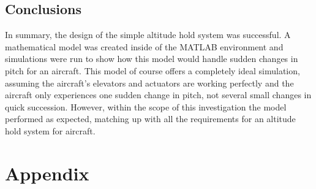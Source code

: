 \documentclass[stu, a4paper, 12pt, floatsintext]{apa7}
\numberwithin{figure}{section}
\numberwithin{table}{section}
\numberwithin{equation}{section}
\begin{document}
\subsection{Conclusions} 
In summary, the design of the simple altitude hold system was successful. A mathematical model was created inside of the MATLAB environment and simulations were run to show how this model would handle sudden changes in pitch for an aircraft. This model of course offers a completely ideal simulation, assuming the aircraft's elevators and actuators are working perfectly and the aircraft only experiences one sudden change in pitch, not several small changes in quick succession. However, within the scope of this investigation the model performed as expected, matching up with all the requirements for an altitude hold system for aircraft.  
\newpage
\section{Appendix}
\listoffigures
\listoftables
\listofmyequations

\newpage

\printbibliography
\end{document}
